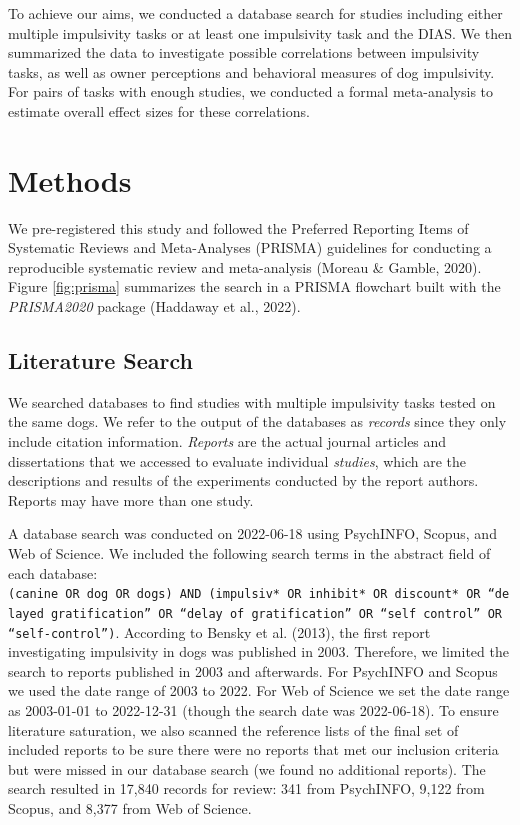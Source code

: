 \documentclass[
  ,pub,floatsintext]{apa6}
\begin{document}

To achieve our aims, we conducted a database search for studies including either multiple impulsivity tasks or at least one impulsivity task and the DIAS. We then summarized the data to investigate possible correlations between impulsivity tasks, as well as owner perceptions and behavioral measures of dog impulsivity. For pairs of tasks with enough studies, we conducted a formal meta-analysis to estimate overall effect sizes for these correlations.

\hypertarget{methods}{%
\section{Methods}\label{methods}}

We pre-registered this study and followed the Preferred Reporting Items of Systematic Reviews and Meta-Analyses (PRISMA) guidelines for conducting a reproducible systematic review and meta-analysis (Moreau \& Gamble, 2020). Figure \ref{fig:prisma} summarizes the search in a PRISMA flowchart built with the \emph{PRISMA2020} package (Haddaway et al., 2022).

\hypertarget{literature-search}{%
\subsection{Literature Search}\label{literature-search}}

We searched databases to find studies with multiple impulsivity tasks tested on the same dogs. We refer to the output of the databases as \emph{records} since they only include citation information. \emph{Reports} are the actual journal articles and dissertations that we accessed to evaluate individual \emph{studies}, which are the descriptions and results of the experiments conducted by the report authors. Reports may have more than one study.

A database search was conducted on 2022-06-18 using PsychINFO, Scopus, and Web of Science. We included the following search terms in the abstract field of each database: \texttt{(canine\ OR\ dog\ OR\ dogs)\ AND\ (impulsiv*\ OR\ inhibit*\ OR\ discount*\ OR\ “delayed\ gratification”\ OR\ “delay\ of\ gratification”\ OR\ “self\ control”\ OR\ “self-control”)}. According to Bensky et al. (2013), the first report investigating impulsivity in dogs was published in 2003. Therefore, we limited the search to reports published in 2003 and afterwards. For PsychINFO and Scopus we used the date range of 2003 to 2022. For Web of Science we set the date range as 2003-01-01 to 2022-12-31 (though the search date was 2022-06-18). To ensure literature saturation, we also scanned the reference lists of the final set of included reports to be sure there were no reports that met our inclusion criteria but were missed in our database search (we found no additional reports). The search resulted in 17,840 records for review: 341 from PsychINFO, 9,122 from Scopus, and 8,377 from Web of Science.
\end{document}
